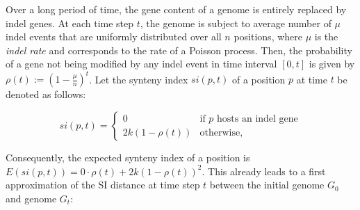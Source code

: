 \documentclass[9pt,english,utf8]{article}
\begin{document}
\begin{center}
\end{center}


\noindent Over a long period of time, the gene content of a genome is entirely
replaced by indel genes. At each time step $t$, the genome is subject to
average number of $\mu$ indel events that are uniformly distributed over all
$n$ positions, where $\mu$ is the \emph{indel rate} and corresponds to the rate
of a Poisson process. Then, the probability of a gene not being modified by any
indel event in time interval $[0, t]$ is given by $\rho(t) :=
(1-\frac{\mu}{n})^t$.  Let the synteny index $\mathit{si}(p, t)$ of a position
$p$ at time $t$ be denoted as follows:

\begin{equation}
    \mathit{si}(p,t) = \begin{cases} 0 & \textrm{if $p$ hosts an indel gene}\\
        2k(1-\rho(t)) & \textrm{otherwise,} \end{cases}
\end{equation}

\noindent Consequently, the expected synteny index of a position is $E(si(p,t))
= 0 \cdot \rho(t) + 2k(1-\rho(t))^2$.  This already leads to a first approximation
of the SI distance at time step $t$ between the initial genome $G_0$ and genome
$G_t$:
\end{document}
